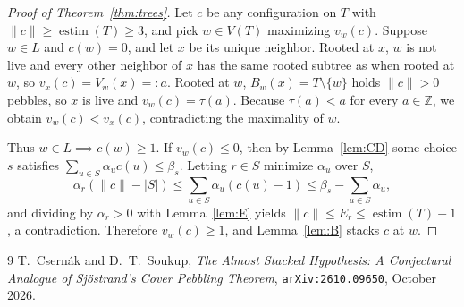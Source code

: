 \documentclass[11pt]{article}
\DeclareMathOperator{\estim}{estim}
\begin{document}
\begin{proof}[Proof of Theorem~\ref{thm:trees}]
Let $c$ be any configuration on $T$ with $\|c\| \ge \estim(T) \ge 3$, and pick $w \in V(T)$ maximizing $v_w(c)$. Suppose $w \in L$ and $c(w) = 0$, and let $x$ be its unique neighbor. Rooted at $x$, $w$ is not live and every other neighbor of $x$ has the same rooted subtree as when rooted at $w$, so $v_x(c) = V_w(x) =: a$. Rooted at $w$, $B_w(x) = T \setminus \{w\}$ holds $\|c\| > 0$ pebbles, so $x$ is live and $v_w(c) = \tau(a)$. Because $\tau(a) < a$ for every $a \in \mathbb{Z}$, we obtain $v_w(c) < v_x(c)$, contradicting the maximality of $w$.

Thus $w \in L \implies c(w) \ge 1$. If $v_w(c) \le 0$, then by Lemma~\ref{lem:CD} some choice $s$ satisfies $\sum_{u \in S} \alpha_u c(u) \le \beta_s$. Letting $r \in S$ minimize $\alpha_u$ over $S$,
\[
\alpha_r(\|c\| - |S|) \le \sum_{u \in S} \alpha_u(c(u) - 1) \le \beta_s - \sum_{u \in S} \alpha_u,
\]
and dividing by $\alpha_r > 0$ with Lemma~\ref{lem:E} yields $\|c\| \le E_r \le \estim(T) - 1$, a contradiction. Therefore $v_w(c) \ge 1$, and Lemma~\ref{lem:B} stacks $c$ at $w$.
\end{proof}

\begin{thebibliography}{9}
T.~Csern\'ak and D.~T.~Soukup, \emph{The Almost Stacked Hypothesis: A Conjectural Analogue of Sj\"ostrand's Cover Pebbling Theorem}, \texttt{arXiv:2610.09650}, October 2026.
\end{thebibliography}
\end{document}

